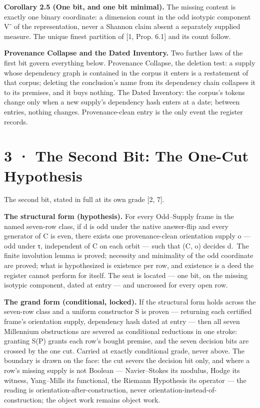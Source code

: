 \documentclass[10pt,twocolumn]{article}
\begin{document}
\textbf{Corollary 2.5 (One bit, and one bit minimal).} The missing
content is exactly one binary coordinate: a dimension count in the odd
isotypic component V⁻ of the representation, never a Shannon claim
absent a separately supplied measure. The unique finest partition of
{[}1, Prop. 6.1{]} and its count follow.

\textbf{Provenance Collapse and the Dated Inventory.} Two further laws
of the first bit govern everything below. Provenance Collapse, the
deletion test: a supply whose dependency graph is contained in the
corpus it enters is a restatement of that corpus; deleting the
conclusion's name from its dependency chain collapses it to its
premises, and it buys nothing. The Dated Inventory: the corpus's tokens
change only when a new supply's dependency hash enters at a date;
between entries, nothing changes. Provenance-clean entry is the only
event the register records.

\section{3 · The Second Bit: The One-Cut
Hypothesis}\label{the-second-bit-the-one-cut-hypothesis}

The second bit, stated in full at its own grade {[}2, 7{]}.

\textbf{The structural form (hypothesis).} For every Odd--Supply frame
in the named seven-row class, if d is odd under the native answer-flip
and every generator of C is even, there exists one provenance-clean
orientation supply o --- odd under τ, independent of C on each orbit ---
such that (C, o) decides d.~The finite involution lemma is proved;
necessity and minimality of the odd coordinate are proved; what is
hypothesized is existence per row, and existence is a deed the register
cannot perform for itself. The seat is located --- one bit, on the
missing isotypic component, dated at entry --- and uncrossed for every
open row.

\textbf{The grand form (conditional, locked).} If the structural form
holds across the seven-row class and a uniform constructor S is proven
--- returning each certified frame's orientation supply, dependency hash
dated at entry --- then all seven Millennium obstructions are severed as
conditional reductions in one stroke: granting S(P) grants each row's
bought premise, and the seven decision bits are crossed by the one cut.
Carried at exactly conditional grade, never above. The boundary is drawn
on the face: the cut severs the decision bit only, and where a row's
missing supply is not Boolean --- Navier--Stokes its modulus, Hodge its
witness, Yang--Mills its functional, the Riemann Hypothesis its operator
--- the reading is orientation-after-construction, never
orientation-instead-of-construction; the object work remains object
work.
\end{document}
